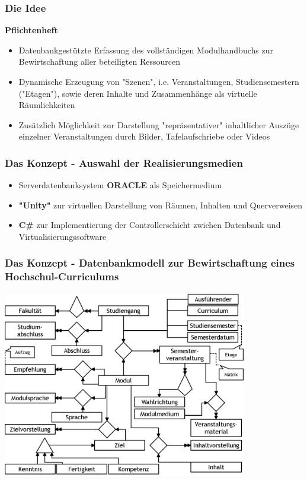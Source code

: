 \documentclass{beamer}
\begin{document}

\begin{frame}
\frametitle{Die Idee}
\textbf{Pflichtenheft}
\begin{itemize}
\item Datenbankgestützte Erfassung des vollständigen Modulhandbuchs zur Bewirtschaftung aller beteiligten Ressourcen 
\item Dynamische Erzeugung von "Szenen", i.e. Veranstaltungen, Studiensemestern ("Etagen"), sowie deren Inhalte und  Zusammenhänge als virtuelle Räumlichkeiten 
\item Zusätzlich Möglichkeit zur Darstellung "repräsentativer" inhaltlicher Auszüge einzelner Veranstaltungen durch Bilder, Tafelaufschriebe oder Videos
\end{itemize}
\end{frame}



\begin{frame}
\frametitle{Das Konzept - Auswahl der Realisierungsmedien}
\begin{itemize}
\item Serverdatenbanksystem \textbf{ORACLE} als Speichermedium
\item \textbf{"Unity"} zur virtuellen Darstellung von Räumen, Inhalten und Querverweisen 
\item \textbf{C\#} zur Implementierung der Controllerschicht zwichen Datenbank und Virtualisierungssoftware
\end{itemize}
\end{frame}



\begin{frame}
\frametitle{Das Konzept - Datenbankmodell zur Bewirtschaftung eines Hochschul-Curriculums}
\begin{center}
\includegraphics[width=0.8\textwidth]{pictures/Datenmodell_Viculum.png}
\end{center}
\end{frame}
\end{document}
